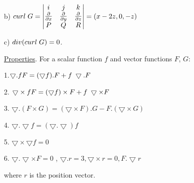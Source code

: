 \documentclass[11pt,a4paper]{article}
\begin{document}
\hspace{1.8cm} b) $curl \hspace{0.1cm} G =  \begin{vmatrix} 
i & j & k\\
\frac{\partial}{\partial x} & \frac{\partial}{\partial y} & \frac{\partial}{\partial z} \\
P & Q & R
\end{vmatrix} = (x-2z, 0, -z)$ \vspace{0.25cm}

\hspace{1.8cm} c) $div(curl \hspace{0.1cm} G) = 0$. \vspace{0.25cm}

\hspace{1.8cm} \underline{Properties}. For a scalar function $f$ and vector functions $F$, $G$: \vspace{0.25cm}

\hspace{1.8cm} 1.$ \bigtriangledown . fF = (\bigtriangledown f).F + f \hspace{0.1cm} \bigtriangledown.F $ \vspace{0.25cm}

\hspace{1.8cm} 2. $  \bigtriangledown  \times fF = ( \bigtriangledown f)  \times F + f \hspace{0.1cm}  \bigtriangledown  \times F $ \vspace{0.25cm}

\hspace{1.8cm} 3. $ \bigtriangledown . (F  \times G) = (\bigtriangledown  \times F) .G - F.(\bigtriangledown  \times G) $ \vspace{0.25cm}

\hspace{1.8cm} 4. $ \bigtriangledown . \bigtriangledown f = (\bigtriangledown . \bigtriangledown) f $ \vspace{0.25 cm}

\hspace{1.8cm} 5. $ \bigtriangledown  \times \bigtriangledown f = 0 $ \vspace{0.25cm}

\hspace{1.8cm} 6. $ \bigtriangledown . \bigtriangledown  \times F = 0 $ ,             \hspace{3cm}           $ \bigtriangledown .r = 3, \bigtriangledown  \times r = 0, F. \bigtriangledown r  $ \vspace{0.25cm}

\hspace{2.25cm} where $r$ is the position vector.
\end{document}
